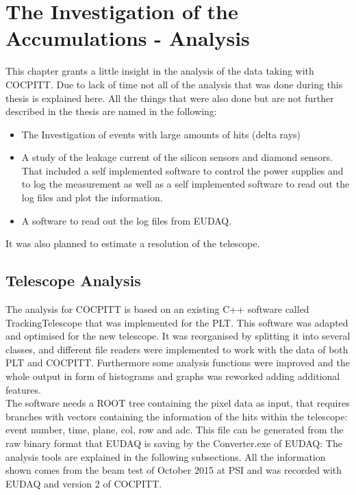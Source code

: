 \documentclass[british,11pt,a4paper]{memoir}
\begin{document}
\tableofcontents
\chapter{The Investigation of the Accumulations - Analysis}
This chapter grants a little insight in the analysis of the data taking with COCPITT. Due to lack of time not all of the analysis that was done during this thesis is explained here. All the things that were also done but are not further described in the thesis are named in the following:
\begin{itemize}
	\item The Investigation of events with large amounts of hits (delta rays)
	\item A study of the leakage current of the silicon sensors and diamond sensors. That included a self implemented software to control the power supplies and to log the measurement as well as a self implemented software to read out the log files and plot the information.
	\item A software to read out the log files from EUDAQ.
\end{itemize}
It was also planned to estimate a resolution of the telescope.

\section{Telescope Analysis}
The analysis for COCPITT is based on an existing C++ software called TrackingTelescope that was implemented for the \ac{PLT}. This software was adapted and optimised for the new telescope. It was reorganised by splitting it into several classes, and different file readers were implemented to work with the data of both \ac{PLT} and COCPITT. Furthermore some analysis functions were improved and the whole output in form of histograms and graphs was reworked adding additional features.\\
The software needs a ROOT tree containing the pixel data as input, that requires branches with vectors containing the information of the hits within the telescope: event number, time, plane, col, row and adc. This file can be generated from the raw binary format that EUDAQ is saving by the Converter.exe of EUDAQ:
The analysis tools are explained in the following subsections. All the information shown comes from the beam test of October 2015 at \ac{PSI} and was recorded with EUDAQ and version 2 of COCPITT.
\end{document}
